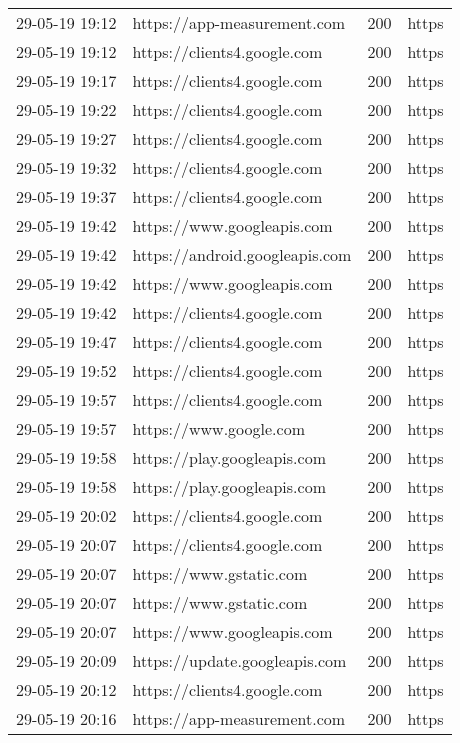 \begin{longtable}[c]{@{}llll@{}}
    29-05-19 19:12 & https://app-measurement.com & 200 & https \\
    29-05-19 19:12 & https://clients4.google.com & 200 & https \\
    29-05-19 19:17 & https://clients4.google.com & 200 & https \\
    29-05-19 19:22 & https://clients4.google.com & 200 & https \\
    29-05-19 19:27 & https://clients4.google.com & 200 & https \\
    29-05-19 19:32 & https://clients4.google.com & 200 & https \\
    29-05-19 19:37 & https://clients4.google.com & 200 & https \\
    29-05-19 19:42 & https://www.googleapis.com & 200 & https \\
    29-05-19 19:42 & https://android.googleapis.com & 200 & https \\
    29-05-19 19:42 & https://www.googleapis.com & 200 & https \\
    29-05-19 19:42 & https://clients4.google.com & 200 & https \\
    29-05-19 19:47 & https://clients4.google.com & 200 & https \\
    29-05-19 19:52 & https://clients4.google.com & 200 & https \\
    29-05-19 19:57 & https://clients4.google.com & 200 & https \\
    29-05-19 19:57 & https://www.google.com & 200 & https \\
    29-05-19 19:58 & https://play.googleapis.com & 200 & https \\
    29-05-19 19:58 & https://play.googleapis.com & 200 & https \\
    29-05-19 20:02 & https://clients4.google.com & 200 & https \\
    29-05-19 20:07 & https://clients4.google.com & 200 & https \\
    29-05-19 20:07 & https://www.gstatic.com & 200 & https \\
    29-05-19 20:07 & https://www.gstatic.com & 200 & https \\
    29-05-19 20:07 & https://www.googleapis.com & 200 & https \\
    29-05-19 20:09 & https://update.googleapis.com & 200 & https \\
    29-05-19 20:12 & https://clients4.google.com & 200 & https \\
    29-05-19 20:16 & https://app-measurement.com & 200 & https \\

\end{longtable}
